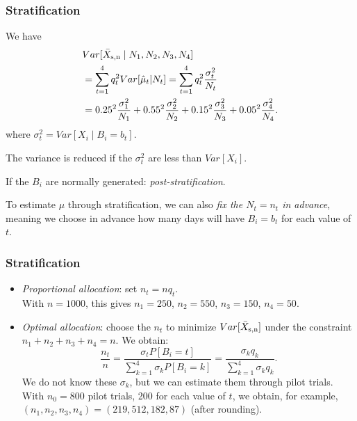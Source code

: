 \documentclass[t,usepdftitle=false]{beamer}
\begin{document}
\begin{frame}
	\frametitle{Stratification}
	
	We have 
	\begin{align*}
		&  Var[\bar X_{\rm{s},n} \mid N_1, N_2, N_3, N_4] \\
		&= \sum_{t=1}^4 q_t^2 Var[\hat\mu_t | N_t]  
		= \sum_{t=1}^4 q_t^2 \frac{\sigma^2_t}{N_t} \\
		&= 0.25^2 \frac{\sigma^2_1}{N_1} + 0.55^2 \frac{\sigma^2_2}{N_2} + 
		0.15^2 \frac{\sigma^2_3}{N_3} + 0.05^2 \frac{\sigma^2_4}{N_4}.
	\end{align*}
	where \(\sigma^2_t = Var[X_i\mid B_i=b_t]\).
	
	\mbox{}
	
	The variance is reduced if the \(\sigma_t^2\) are less than \(Var[X_i]\).
	
	\mbox{}
	
	If the \(B_i\) are normally generated: \emph{post-stratification}.
	
	\mbox{}
	
	To estimate \(\mu\) through stratification, we can also 
	\emph{fix the \(N_t = n_t\) in advance}, meaning we choose 
	in advance how many days will have \(B_i = b_t\) for each value of 
	\(t\).
	
\end{frame}

\begin{frame}
	\frametitle{Stratification}
	
	\begin{itemize}
		\item
		\emph{Proportional allocation}: set \(n_t = n q_t\).\\
		With \(n=1000\), this gives \(n_1 = 250\), \(n_2 = 550\), \(n_3 = 150\), \(n_4 = 50\).
		\item
		\emph{Optimal allocation}: 
		choose the \(n_t\) to minimize \(Var[\bar X_{\rm{s},n}]\) under the constraint
		\(n_1+n_2+n_3+n_4=n\). We obtain:
		\[
		\frac{{n_t}}{n} 
		= \frac{\sigma_t P[B_i=t]}{\sum_{k=1}^4 \sigma_k P[B_i=k]}
		= \frac{\sigma_k q_k}{\sum_{k=1}^4 \sigma_k q_k}.
		\]
		We do not know these \(\sigma_k\), but we can estimate them through pilot trials.
		With \(n_0=800\) pilot trials, 200 for each value of \(t\), we obtain, for example, \((n_1, n_2, n_3, n_4) = (219, 512, 182, 87)\) (after rounding). 
	\end{itemize}
	
\end{frame}
\end{document}
